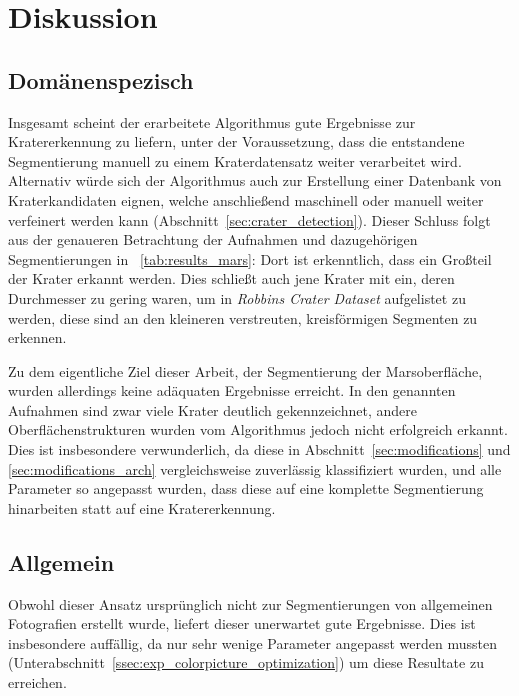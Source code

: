 \section{Diskussion}
\label{sec:discussion}

\subsection{Domänenspezisch}
\label{ssec:discussion_domain}

Insgesamt scheint der erarbeitete Algorithmus gute Ergebnisse zur Kratererkennung zu liefern, unter der Voraussetzung, dass die entstandene Segmentierung manuell zu einem Kraterdatensatz weiter verarbeitet wird. Alternativ würde sich der Algorithmus auch zur Erstellung einer Datenbank von Kraterkandidaten eignen, welche anschließend maschinell oder manuell weiter verfeinert werden kann (\vgl Abschnitt~\ref{sec:crater_detection}). Dieser Schluss folgt aus der genaueren Betrachtung der Aufnahmen und dazugehörigen Segmentierungen in \tablename~\ref{tab:results_mars}: Dort ist erkenntlich, dass ein Großteil der Krater erkannt werden. Dies schließt auch jene Krater mit ein, deren Durchmesser zu gering waren, um in \textit{Robbins Crater Dataset} aufgelistet zu werden, diese sind an den kleineren verstreuten, kreisförmigen Segmenten zu erkennen.

Zu dem eigentliche Ziel dieser Arbeit, der Segmentierung der Marsoberfläche, wurden allerdings keine adäquaten Ergebnisse erreicht. In den genannten Aufnahmen sind zwar viele Krater deutlich gekennzeichnet, andere Oberflächenstrukturen wurden vom Algorithmus jedoch nicht erfolgreich erkannt. Dies ist insbesondere verwunderlich, da diese in Abschnitt~\ref{sec:modifications} und \ref{sec:modifications_arch} vergleichsweise zuverlässig klassifiziert wurden, und alle Parameter so angepasst wurden, dass diese auf eine komplette Segmentierung hinarbeiten statt auf eine Kratererkennung.

\subsection{Allgemein}
\label{ssec:discussion_allgemein}

Obwohl dieser Ansatz ursprünglich nicht zur Segmentierungen von allgemeinen Fotografien erstellt wurde, liefert dieser unerwartet gute Ergebnisse. Dies ist insbesondere auffällig, da nur sehr wenige Parameter angepasst werden mussten (\vgl Unterabschnitt~\ref{ssec:exp_colorpicture_optimization}) um diese Resultate zu erreichen.

